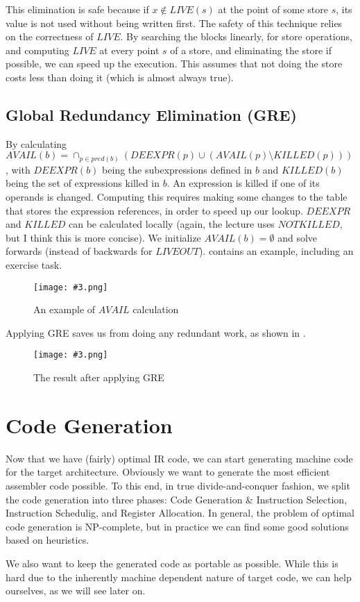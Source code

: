 \documentclass{article}
\newcommand{\fig}[4]{
	\begin{figure}[#1]
		\center
		\texttt{[image: \#3.png]}
		\caption{#4}
		\label{fig:#3}
	\end{figure}
	}
\begin{document}
This elimination is safe because if $x \notin LIVE(s)$ at the point of some store $s$, its value is not used without being written first.
The safety of this technique relies on the correctness of $LIVE$.
By searching the blocks linearly, for store operations, and computing $LIVE$ at every point $s$ of a store, and eliminating the store if possible, we can speed up the execution.
This assumes that not doing the store costs less than doing it (which is almost always true).

\subsection{Global Redundancy Elimination (GRE)}
By calculating $AVAIL(b) = \cap_{p \in pred(b)} (DEEXPR(p) \cup (AVAIL(p) \setminus KILLED(p)))$, with $DEEXPR(b)$ being the subexpressions defined in $b$ and $KILLED(b)$ being the set of expressions killed in $b$.
An expression is killed if one of its operands is changed.
Computing this requires making some changes to the table that stores the expression references, in order to speed up our lookup.
$DEEXPR$ and $KILLED$ can be calculated locally (again, the lecture uses $NOTKILLED$, but I think this is more concise).
We initialize $AVAIL(b) = \emptyset$ and solve forwards (instead of backwards for $LIVEOUT$).
 contains an example, including an exercise task.

\fig{h}{}{avail}{An example of $AVAIL$ calculation}

Applying GRE saves us from doing any redundant work, as shown in .

\fig{h}{0.7}{gre}{The result after applying GRE}

\section{Code Generation}
Now that we have (fairly) optimal IR code, we can start generating machine code for the target architecture.
Obviously we want to generate the most efficient assembler code possible.
To this end, in true divide-and-conquer fashion, we split the code generation into three phases: Code Generation \& Instruction Selection, Instruction Schedulig, and Register Allocation.
In general, the problem of optimal code generation is NP-complete, but in practice we can find some good solutions based on heuristics.

We also want to keep the generated code as portable as possible.
While this is hard due to the inherently machine dependent nature of target code, we can help ourselves, as we will see later on.
\end{document}
